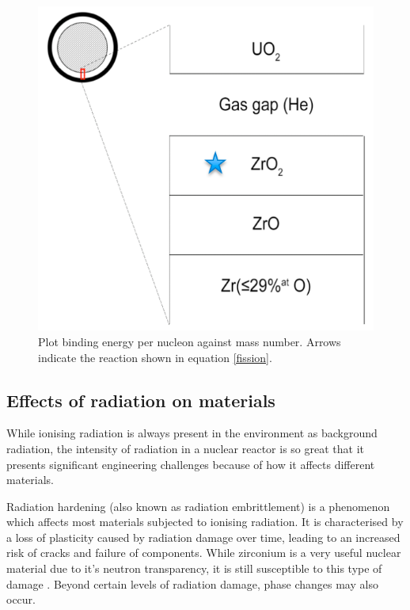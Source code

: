 \begin{figure}[htp]
\centering
\includegraphics[width=14cm]{images/gas_gap.png}
\caption[Plot binding energy per nucleon against mass number. Arrows indicate the reaction shown in equation \ref{fission}.]{Plot binding energy per nucleon against mass number. Arrows indicate the reaction shown in equation \ref{fission}.}
\label{figure:gas_gap}
\end{figure}


\subsection{Effects of radiation on materials}

While ionising radiation is always present in the environment as background radiation, the intensity of radiation in a nuclear reactor is so great that it presents significant engineering challenges because of how it affects different materials.

Radiation hardening (also known as radiation embrittlement) is a phenomenon which affects most materials subjected to ionising radiation. It is characterised by a loss of plasticity caused by radiation damage over time, leading to an increased risk of cracks and failure of components. While zirconium is a very useful nuclear material due to it's neutron transparency, it is still susceptible to this type of damage \cite{Wisner1998}. Beyond certain levels of radiation damage, phase changes may also occur. %

